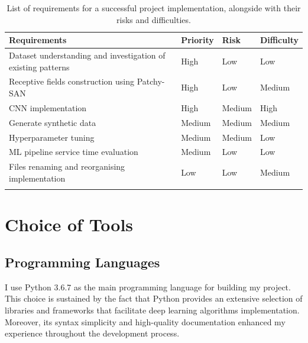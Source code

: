\begin{longtable}{|p{}|p{}|p{}|p{}|}
  \hline
  \textbf{Requirements}                                        & \textbf{Priority} & \textbf{Risk} & \textbf{Difficulty} \\
  \hline
  Dataset understanding and investigation of existing patterns & High              & Low           & Low                 \\

  Receptive fields construction using Patchy-SAN               & High              & Low           & Medium              \\

  CNN implementation                                           & High              & Medium        & High                \\

  Generate synthetic data                                      & Medium            & Medium        & Medium              \\

  Hyperparameter tuning                                        & Medium            & Medium        & Low                 \\

  ML pipeline service time evaluation                          & Medium            & Low           & Low                 \\

  Files renaming and reorganising implementation               & Low               & Low           & Medium              \\

  \hline
  \caption[Requirements overview]{List of requirements for a successful project implementation, alongside with their risks and difficulties.}
  \label{Requirements overview}
\end{longtable} \bigskip


\section{Choice of Tools}

\subsection{Programming Languages}

I use Python 3.6.7 as the main programming language for building my project. This choice is sustained by the fact that Python provides an extensive selection of libraries and frameworks that facilitate deep learning algorithms implementation. Moreover, its syntax simplicity and high-quality documentation enhanced my experience throughout the development process. \smallskip


